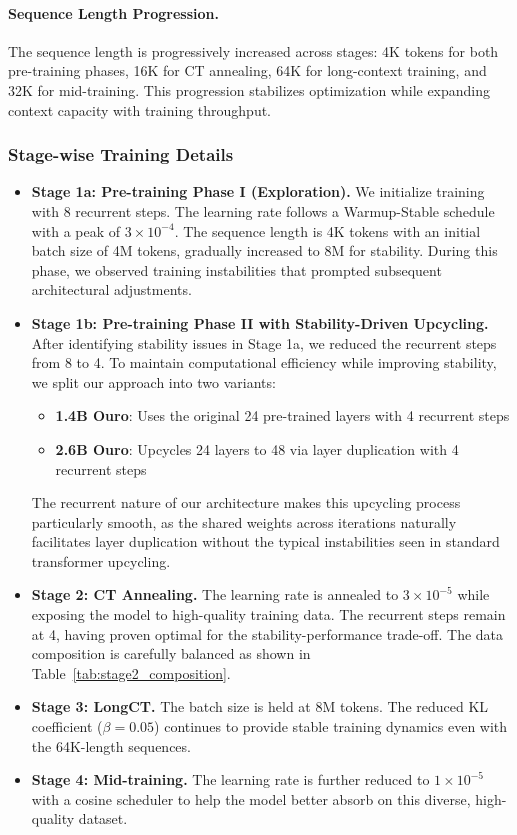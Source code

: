 \documentclass[]{bytedance_seed}
\newcommand{\1}{\mathbf{1}}
\begin{document}
\paragraph{Sequence Length Progression.} 
The sequence length is progressively increased across stages: 4K tokens for both pre-training phases, 16K for CT annealing, 64K for long-context training, and 32K for mid-training. This progression stabilizes optimization while expanding context capacity with training throughput.


\subsubsection{Stage-wise Training Details}

\begin{itemize}[itemsep=0.0pt,topsep=0pt,leftmargin=*]
    \item \textbf{Stage 1a: Pre-training Phase I (Exploration).} We initialize training with 8 recurrent steps. The learning rate follows a Warmup-Stable schedule with a peak of $3 \times 10^{-4}$. The sequence length is 4K tokens with an initial batch size of 4M tokens, gradually increased to 8M for stability. During this phase, we observed training instabilities that prompted subsequent architectural adjustments.
    \item \textbf{Stage 1b: Pre-training Phase II with Stability-Driven Upcycling.} After identifying stability issues in Stage 1a, we reduced the recurrent steps from 8 to 4. To maintain computational efficiency while improving stability, we split our approach into two variants:
    \begin{itemize}
        \item \textbf{1.4B Ouro}: Uses the original 24 pre-trained layers with 4 recurrent steps
        \item \textbf{2.6B Ouro}: Upcycles 24 layers to 48 via layer duplication with 4 recurrent steps
    \end{itemize}
    The recurrent nature of our architecture makes this upcycling process particularly smooth, as the shared weights across iterations naturally facilitates layer duplication without the typical instabilities seen in standard transformer upcycling.
    
    \item \textbf{Stage 2: CT Annealing.} The learning rate is annealed to $3 \times 10^{-5}$ while exposing the model to high-quality training data. The recurrent steps remain at 4, having proven optimal for the stability-performance trade-off. The data composition is carefully balanced as shown in Table~\ref{tab:stage2_composition}.
    
    \item \textbf{Stage 3: LongCT.} The batch size is held at 8M tokens. The reduced KL coefficient ($\beta = 0.05$) continues to provide stable training dynamics even with the 64K-length sequences.
    
    \item \textbf{Stage 4: Mid-training.} The learning rate is further reduced to $1 \times 10^{-5}$ with a cosine scheduler to help the model better absorb on this diverse, high-quality dataset.
\end{itemize}
\end{document}
